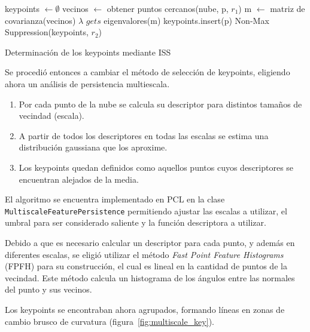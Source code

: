 			\begin{algorithm}
				\begin{algorithmic}[1]
						\State keypoints $\gets\emptyset$
							\State vecinos $\gets$ obtener puntos cercanos(nube, p, $r_1$)
							\State m $\gets$ matriz de covarianza(vecinos)
							\State $\lambda$ $gets$ eigenvalores(m)
								\State keypoints.insert(p)
							\EndIf
						\EndFor
						\State\Return Non-Max Suppression(keypoints, $r_2$) 
					\EndFunction
				\end{algorithmic}
				\caption{\label{alg:iss}Determinación de los keypoints mediante ISS}
			\end{algorithm}


			Se procedió entonces a cambiar el método de selección de keypoints, eligiendo ahora un análisis de persistencia multiescala\cite{Rusu:2009:FPF:1703435.1703733}.
			\begin{enumerate}
				\item Por cada punto de la nube se calcula su descriptor para distintos tamaños de vecindad (escala).
				\item A partir de todos los descriptores en todas las escalas se estima una distribución gaussiana que los aproxime.
				\item Los keypoints quedan definidos como aquellos puntos cuyos descriptores se encuentran alejados de la media.
			\end{enumerate}
			El algoritmo se encuentra implementado en PCL en la clase
			\texttt{Multiscale\-Feature\-Persistence} permitiendo ajustar las
			escalas a utilizar, el umbral para ser considerado saliente y la
			función descriptora a utilizar.

			Debido a que es necesario calcular un descriptor para cada punto, y
			además en diferentes escalas, se eligió utilizar el método
			\emph{Fast Point Feature Histograms} (FPFH) para su construcción,
			el cual es lineal en la cantidad de puntos de la vecindad.
			Este método calcula un histograma de los ángulos entre las normales del punto y sus vecinos\cite{Rusu:2009:FPF:1703435.1703733}.

			Los keypoints se encontraban ahora agrupados, formando líneas en zonas de cambio brusco de curvatura (figura~\ref{fig:multiscale_key}).

